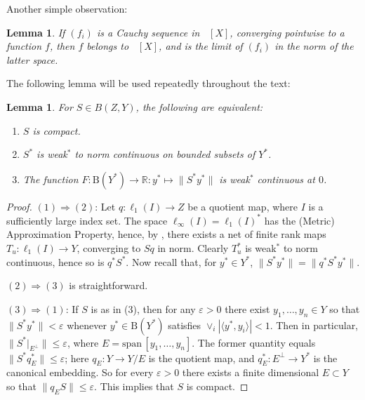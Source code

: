 \documentclass{amsart}
\theoremstyle{plain}
\newtheorem{lemma}[theorem]{Lemma}
\theoremstyle{definition}
\numberwithin{equation}{section}
\newcommand{\R}{\mathbb{R}}
\newcommand{\spn}{\textrm{span}\,}
\newcommand{\vr}{\varepsilon}
\newcommand{\ball}{\mathrm{B}}
\DeclareMathOperator{\FBLp}{FBL^{\mathit{(p)}}}
\begin{document}
Another simple observation:

\begin{lemma}\label{Cauchy seq}
	If $(f_i)$ is a Cauchy sequence in $\FBLp[X]$, converging pointwise to a function $f$, then $f$ belongs to $\FBLp[X]$, and is the limit of $(f_i)$ in the norm of the latter space.
\end{lemma}

The following lemma will be used repeatedly throughout the text: 

\begin{lemma}\label{weak* continuity}
For $S \in B(Z,Y)$, the following are equivalent:
\begin{enumerate}
   \item $S$ is compact.
   \item $S^*$ is weak$^*$ to norm continuous on bounded subsets of $Y^*$.
   \item The function $F : \ball(Y^*) \to \R : y^* \mapsto \|S^* y^*\|$ is weak$^*$ continuous at $0$.
\end{enumerate}
\end{lemma}

\begin{proof}
$(1) \Rightarrow (2)$:
Let $q : \ell_1(I) \to Z$ be a quotient map, where $I$ is a sufficiently large index set. The space $\ell_\infty(I) = \ell_1(I)^*$ has the (Metric) Approximation Property, hence, by \cite[Theorem 1.e.5]{LT1}, there exists a net of finite rank maps $T_u : \ell_1(I) \to Y$, converging to $Sq$ in norm. Clearly $T_u^*$ is weak$^*$ to norm continuous, hence so is $q^* S^*$. Now recall that, for $y^* \in Y^*$, $\|S^* y^*\| = \|q^* S^* y^*\|$. 

$(2) \Rightarrow (3)$ is straightforward.

$(3) \Rightarrow (1)$: If $S$ is as in (3), then for any $\vr > 0$ there exist $y_1, \ldots, y_n \in Y$  so that $\|S^* y^*\| < \vr$ whenever $y^* \in \ball(Y^*)$ satisfies $\vee_i |\langle y^*, y_i \rangle| < 1$.
Then in particular, $\|S^*|_{E^\perp}\| \leq \vr$, where $E = \spn[y_1, \ldots, y_n]$. The former quantity equals $\|S^* q_E^*\| \leq \vr$; here $q_E : Y \to Y/E$ is the quotient map, and $q_E^* : E^\perp \to Y^*$ is the canonical embedding.
So for every $\vr > 0$ there exists a finite dimensional $E \subset Y$ so that $\|q_E S\| \leq \vr$. This implies that $S$ is compact.
\end{proof}
\end{document}
